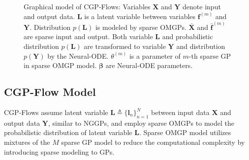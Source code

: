 \documentclass[sn-mathphys-num]{sn-jnl}
\begin{document}
 \begin{figure}[t]
    \centering
    \caption{Graphical model of CGP-Flows: Variables $\mathbf{X}$ and $\mathbf Y$ denote input and output data. $\mathbf{L}$ is a latent variable between variables $\mathbf f^{(m)}$ and $\mathbf Y$. Distribution $p(\mathbf L)$ is modeled by sparse OMGPs. $\bar{\mathbf X}$ and $\bar{\mathbf f}^{(m)}$ are sparse input and output. Both variable $\mathbf L$ and probabilistic distribution $p(\mathbf L)$ are transformed to variable $\mathbf Y$ and distribution $p(\mathbf Y)$ by the Neural-ODE. $\theta^{(m)}$ is a parameter of $m$-th sparse GP in sparse OMGP model. $\boldsymbol{\beta}$ are Neural-ODE parameters.}
    \label{fig:graphical:model}
\end{figure}


\subsection{CGP-Flow Model}
CGP-Flows assume latent variable $\mathbf L\triangleq\{\mathbf{l}_n\}_{n=1}^{N}$ between input data $\mathbf X$ and output data $\mathbf Y$, similar to NGGPs, and employ sparse OMGPs to model the probabilistic distribution of latent variable $\mathbf L$.
Sparse OMGP model utilizes mixtures of the $M$ sparse GP model to reduce the computational complexity by introducing sparse modeling to GPs.
\end{document}
